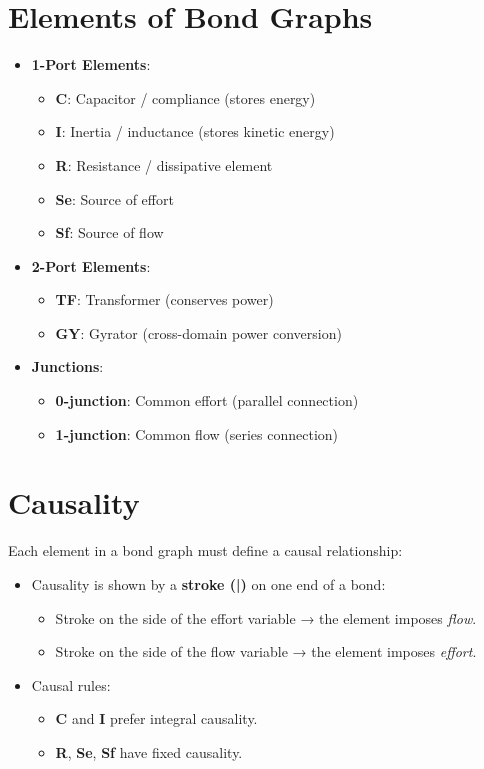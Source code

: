\documentclass[12pt]{article}
\begin{document}
\section*{Elements of Bond Graphs}
\begin{multicols}{2}
\begin{itemize}[leftmargin=*]
    \item \textbf{1-Port Elements}:
    \begin{itemize}
        \item \textbf{C}: Capacitor / compliance (stores energy)
        \item \textbf{I}: Inertia / inductance (stores kinetic energy)
        \item \textbf{R}: Resistance / dissipative element
        \item \textbf{Se}: Source of effort
        \item \textbf{Sf}: Source of flow
    \end{itemize}

    \item \textbf{2-Port Elements}:
    \begin{itemize}
        \item \textbf{TF}: Transformer (conserves power)
        \item \textbf{GY}: Gyrator (cross-domain power conversion)
    \end{itemize}

    \item \textbf{Junctions}:
    \begin{itemize}
        \item \textbf{0-junction}: Common effort (parallel connection)
        \item \textbf{1-junction}: Common flow (series connection)
    \end{itemize}
\end{itemize}
\end{multicols}

\section*{Causality}
Each element in a bond graph must define a causal relationship:
\begin{itemize}
    \item Causality is shown by a \textbf{stroke (|)} on one end of a bond:
    \begin{itemize}
        \item Stroke on the side of the effort variable → the element imposes \textit{flow}.
        \item Stroke on the side of the flow variable → the element imposes \textit{effort}.
    \end{itemize}
    \item Causal rules:
    \begin{itemize}
        \item \textbf{C} and \textbf{I} prefer integral causality.
        \item \textbf{R}, \textbf{Se}, \textbf{Sf} have fixed causality.
    \end{itemize}
\end{itemize}
\end{document}
